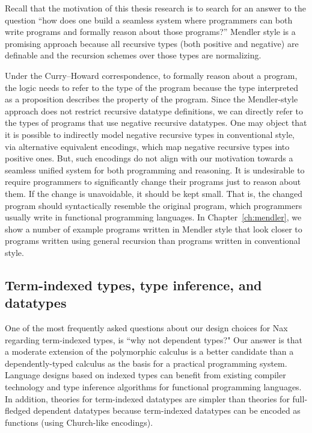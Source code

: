 Recall that the motivation of this thesis research is to search for
an answer to the question ``how does one build a seamless system
where programmers can both write programs and formally reason about
those programs?'' Mendler style is a promising approach because all
recursive types (both positive and negative) are definable and
the recursion schemes over those types are normalizing.

Under the Curry--Howard correspondence, to formally reason about a program,
the logic needs to refer to the type of the program because the type
interpreted as a proposition describes the property of the program.
Since the Mendler-style approach does not restrict recursive datatype
definitions, we can directly refer to the types of programs that use
negative recursive datatypes. One may object that it is possible to
indirectly model negative recursive types in conventional style,
via alternative equivalent encodings, which map negative recursive types
into positive ones. But, such encodings do not align with our motivation
towards a seamless unified system for both programming and reasoning. %
It is undesirable to require programmers to significantly change their
programs just to reason about them. If the change is unavoidable, it should
be kept small. That is, the changed program should syntactically resemble
the original program, which programmers usually write in
functional programming languages. In Chapter~\ref{ch:mendler},
we show a number of example programs written in Mendler style
that look closer to programs written using general recursion
than programs written in conventional style.

\subsection{Term-indexed types, type inference, and datatypes}
\label{sec:intro:concepts:indexed}
One of the most frequently asked questions about our design choices for Nax
regarding term-indexed types, is ``why not dependent types?" Our answer
is that a moderate extension of the polymorphic calculus is a better candidate
than a dependently-typed calculus as the basis for a practical programming
system. Language designs based on indexed types can benefit from
existing compiler technology and type inference algorithms for
functional programming languages. In addition, theories for
term-indexed datatypes are simpler than theories for full-fledged
dependent datatypes because term-indexed datatypes can be encoded as
functions (using Church-like encodings).

